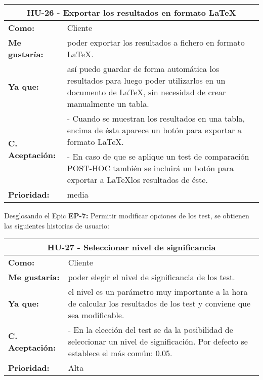 
\begin{table}[H]
	\begin{tabular}{| p{3cm}| p{11cm} |}
		\hline
		\multicolumn{2}{|c|}{\textbf{HU-26} - Exportar los resultados en formato \LaTeX} \\ \hline
		\textbf{Como:} & Cliente \\ \hline
		\textbf{Me gustaría:} & poder exportar los resultados a fichero en formato \LaTeX. \\ \hline
		\textbf{Ya que:} & así puedo guardar de forma automática los resultados para luego poder utilizarlos en un documento de \LaTeX, sin necesidad de crear manualmente un tabla. \\ \hline
		\multirow{2}{11cm}{\textbf{C. Aceptación:}} & - Cuando se muestran los resultados en una tabla, encima de ésta aparece un botón para exportar a formato \LaTeX . \\
		& - En caso de que se aplique un test de comparación POST-HOC también se incluirá un botón para exportar a \LaTeX \space los resultados de éste. \\ \hline
		\textbf{\textbf{Prioridad:}} & media \\ \hline
	\end{tabular}
\end{table}


Desglosando el Epic \textbf{EP-7:} Permitir modificar opciones de los test, se obtienen las siguientes historias de usuario:

\begin{table}[H]
	\begin{tabular}{| p{3cm}| p{11cm} |}
		\hline
		\multicolumn{2}{|c|}{\textbf{HU-27} - Seleccionar nivel de significancia} \\ \hline
		\textbf{Como:} & Cliente \\ \hline
		\textbf{Me gustaría:} & poder elegir el nivel de significancia de los test. \\ \hline
		\textbf{Ya que:} & el nivel es un parámetro muy importante a la hora de calcular los resultados de los test y conviene que sea modificable. \\ \hline
		\textbf{C. Aceptación:} & - En la elección del test se da la posibilidad de seleccionar un nivel de significación. Por defecto se establece el más común: 0.05.  \\ \hline
		\textbf{\textbf{Prioridad:}} & Alta \\ \hline
	\end{tabular}
\end{table}

